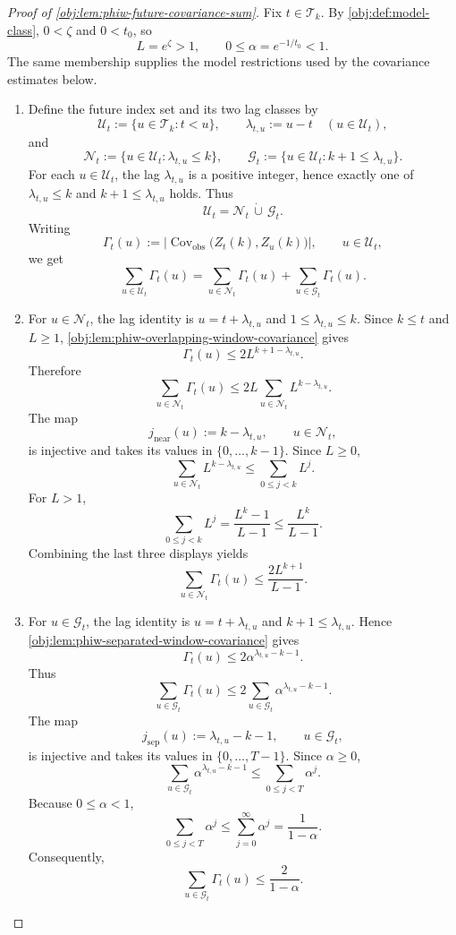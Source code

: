 \documentclass[11pt]{article}
\begin{document}
\begin{proof}[Proof of \cref{obj:lem:phiw-future-covariance-sum}]
Fix \(t\in\mathscr T_k\). By \cref{obj:def:model-class}, \(0<\zeta\) and \(0<t_0\), so
\[
L=e^\zeta>1,
\qquad
0\le \alpha=e^{-1/t_0}<1 .
\]
The same membership supplies the model restrictions used by the covariance estimates below.

\begin{enumerate}
\item Define the future index set and its two lag classes by
\[
\mathscr U_t:=\{u\in\mathscr T_k:t<u\},
\qquad
\lambda_{t,u}:=u-t\quad (u\in\mathscr U_t),
\]
and
\[
\mathscr N_t:=\{u\in\mathscr U_t:\lambda_{t,u}\le k\},
\qquad
\mathscr G_t:=\{u\in\mathscr U_t:k+1\le \lambda_{t,u}\}.
\]
For each \(u\in\mathscr U_t\), the lag \(\lambda_{t,u}\) is a positive integer, hence exactly one of
\(\lambda_{t,u}\le k\) and \(k+1\le\lambda_{t,u}\) holds. Thus
\[
\mathscr U_t=\mathscr N_t\,\dot\cup\,\mathscr G_t .
\]
Writing
\[
\Gamma_t(u):=
\bigl|\operatorname{Cov}_{\mathrm{obs}}\bigl(Z_t(k),Z_u(k)\bigr)\bigr|,
\qquad u\in\mathscr U_t,
\]
we get
\[
\sum_{u\in\mathscr U_t}\Gamma_t(u)
=
\sum_{u\in\mathscr N_t}\Gamma_t(u)
+
\sum_{u\in\mathscr G_t}\Gamma_t(u).
\]

\item For \(u\in\mathscr N_t\), the lag identity is \(u=t+\lambda_{t,u}\) and
\(1\le\lambda_{t,u}\le k\). Since \(k\le t\) and \(L\ge1\), \cref{obj:lem:phiw-overlapping-window-covariance} gives
\[
\Gamma_t(u)\le 2L^{k+1-\lambda_{t,u}}.
\]
Therefore
\[
\sum_{u\in\mathscr N_t}\Gamma_t(u)
\le
2L\sum_{u\in\mathscr N_t}L^{k-\lambda_{t,u}}.
\]
The map
\[
j_{\mathrm{near}}(u):=k-\lambda_{t,u},
\qquad u\in\mathscr N_t,
\]
is injective and takes its values in \(\{0,\ldots,k-1\}\). Since \(L\ge0\),
\[
\sum_{u\in\mathscr N_t}L^{k-\lambda_{t,u}}
\le
\sum_{0\le j<k}L^j .
\]
For \(L>1\),
\[
\sum_{0\le j<k}L^j
=
\frac{L^k-1}{L-1}
\le
\frac{L^k}{L-1}.
\]
Combining the last three displays yields
\[
\sum_{u\in\mathscr N_t}\Gamma_t(u)
\le
\frac{2L^{k+1}}{L-1}.
\]

\item For \(u\in\mathscr G_t\), the lag identity is \(u=t+\lambda_{t,u}\) and
\(k+1\le\lambda_{t,u}\). Hence \cref{obj:lem:phiw-separated-window-covariance} gives
\[
\Gamma_t(u)
\le
2\alpha^{\lambda_{t,u}-k-1}.
\]
Thus
\[
\sum_{u\in\mathscr G_t}\Gamma_t(u)
\le
2\sum_{u\in\mathscr G_t}\alpha^{\lambda_{t,u}-k-1}.
\]
The map
\[
j_{\mathrm{sep}}(u):=\lambda_{t,u}-k-1,
\qquad u\in\mathscr G_t,
\]
is injective and takes its values in \(\{0,\ldots,T-1\}\). Since \(\alpha\ge0\),
\[
\sum_{u\in\mathscr G_t}\alpha^{\lambda_{t,u}-k-1}
\le
\sum_{0\le j<T}\alpha^j .
\]
Because \(0\le\alpha<1\),
\[
\sum_{0\le j<T}\alpha^j
\le
\sum_{j=0}^{\infty}\alpha^j
=
\frac{1}{1-\alpha}.
\]
Consequently,
\[
\sum_{u\in\mathscr G_t}\Gamma_t(u)
\le
\frac{2}{1-\alpha}.
\]


\end{enumerate}
\end{proof}
\end{document}
